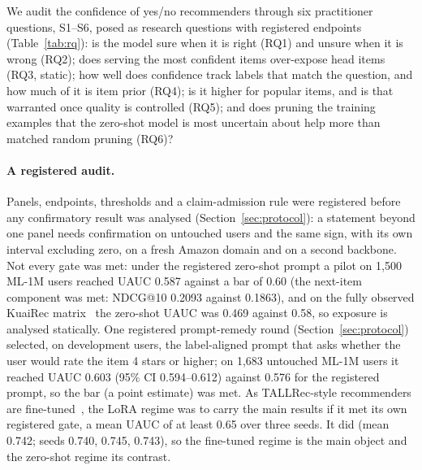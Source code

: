 We audit the confidence of yes/no recommenders through six practitioner questions, S1--S6, posed as research questions with
registered endpoints (Table~\ref{tab:rq}): is the model sure when it is right (RQ1) and unsure when it is wrong (RQ2); does
serving the most confident items over-expose head items (RQ3, static); how well does confidence track labels that match the
question, and how much of it is item prior (RQ4); is it higher for popular items, and is that warranted once quality is
controlled (RQ5); and does pruning the training examples that the zero-shot model is most uncertain about help more than matched
random pruning (RQ6)?

\paragraph{A registered audit.}
Panels, endpoints, thresholds and a claim-admission rule were registered before any confirmatory result was analysed
(Section~\ref{sec:protocol}): a statement beyond one panel needs confirmation on untouched users and the same sign, with its own
interval excluding zero, on a fresh Amazon domain and on a second backbone. Not every gate was met: under the registered zero-shot
prompt a pilot on 1,500 ML-1M users reached UAUC 0.587 against a bar of 0.60 (the next-item component was met: NDCG@10 0.2093
against 0.1863), and on the fully observed KuaiRec matrix~\citep{gao2022kuairec} the zero-shot UAUC was 0.469 against 0.58, so
exposure is analysed statically. One registered prompt-remedy round (Section~\ref{sec:protocol}) selected, on development users,
the label-aligned prompt that asks whether the user would rate the item 4 stars or higher; on 1,683
untouched ML-1M users it reached UAUC 0.603 (95\% CI 0.594--0.612) against 0.576 for the registered
prompt, so the bar (a point estimate) was met. As TALLRec-style recommenders are fine-tuned~\citep{bao2023tallrec}, the LoRA regime
was to carry the main results if it met its own registered gate, a mean UAUC of at least 0.65 over three seeds. It did (mean
0.742; seeds 0.740, 0.745, 0.743), so the fine-tuned regime is the
main object and the zero-shot regime its contrast.

